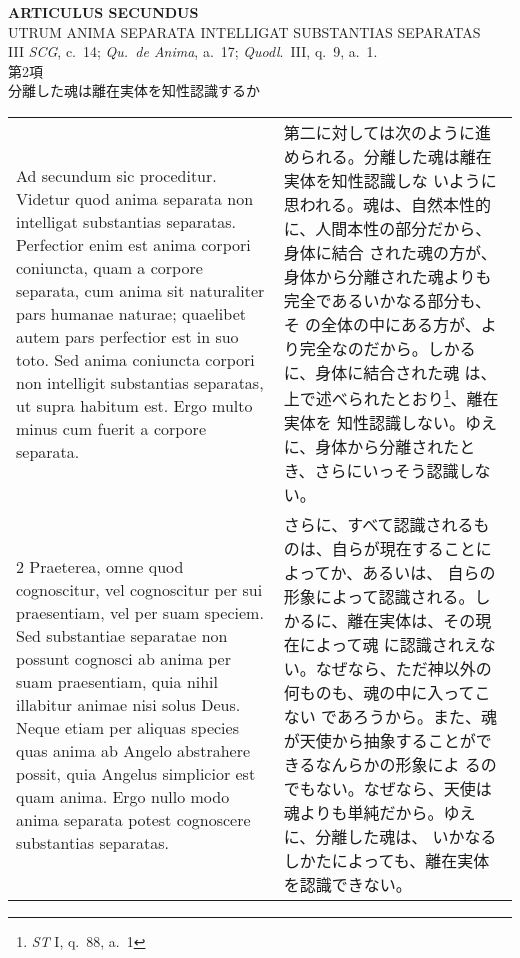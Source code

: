\documentclass[10pt]{jsarticle} %
\begin{document}
\newpage
{}

\begin{center}
{\Large {\bf ARTICULUS SECUNDUS}}\\ {\large UTRUM ANIMA SEPARATA
INTELLIGAT SUBSTANTIAS SEPARATAS}\\ {\footnotesize III {\it SCG},
c.~14; {\it Qu.~de Anima}, a.~17; {\it Quodl}.~III, q.~9, a.~1.}\\
{\Large 第2項\\分離した魂は離在実体を知性認識するか}

\end{center}

\begin{longtable}{p{21em}p{21em}}

{\huge A}{\sc d secundum sic proceditur}. Videtur quod anima separata
non intelligat substantias separatas. Perfectior enim est anima
corpori coniuncta, quam a corpore separata, cum anima sit naturaliter
pars humanae naturae; quaelibet autem pars perfectior est in suo
toto. Sed anima coniuncta corpori non intelligit substantias
separatas, ut supra habitum est. Ergo multo minus cum fuerit a corpore
separata.

&

第二に対しては次のように進められる。分離した魂は離在実体を知性認識しな
いように思われる。魂は、自然本性的に、人間本性の部分だから、身体に結合
された魂の方が、身体から分離された魂よりも完全であるいかなる部分も、そ
の全体の中にある方が、より完全なのだから。しかるに、身体に結合された魂
は、上で述べられたとおり\footnote{{\it ST} I, q.~88, a.~1}、離在実体を
知性認識しない。ゆえに、身体から分離されたとき、さらにいっそう認識しな
い。

\\


2 {\sc Praeterea}, omne quod cognoscitur, vel cognoscitur per sui
praesentiam, vel per suam speciem. Sed substantiae separatae non
possunt cognosci ab anima per suam praesentiam, quia nihil illabitur
animae nisi solus Deus. Neque etiam per aliquas species quas anima ab
Angelo abstrahere possit, quia Angelus simplicior est quam anima. Ergo
nullo modo anima separata potest cognoscere substantias separatas.

&

さらに、すべて認識されるものは、自らが現在することによってか、あるいは、
自らの形象によって認識される。しかるに、離在実体は、その現在によって魂
に認識されえない。なぜなら、ただ神以外の何ものも、魂の中に入ってこない
であろうから。また、魂が天使から抽象することができるなんらかの形象によ
るのでもない。なぜなら、天使は魂よりも単純だから。ゆえに、分離した魂は、
いかなるしかたによっても、離在実体を認識できない。


\end{longtable}
\end{document}
